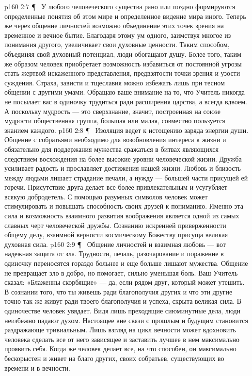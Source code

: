 \vs p160 2:7 \P\ \bibnobreakspace {} У любого человеческого существа рано или поздно формируются определенные понятия об этом мире и определенное видение мира иного. Теперь же через общение личностей возможно объединение этих точек зрения на временное и вечное бытие. Благодаря этому ум одного, заимствуя многое из понимания другого, увеличивает свои духовные ценности. Таким способом, объединяя свой духовный потенциал, люди обогащают душу. Более того, таким же образом человек приобретает возможность избавиться от постоянной угрозы стать жертвой искаженного представления, предвзятости точки зрения и узости суждения. Страха, зависти и тщеславия можно избежать лишь при тесном общении с другими умами. Обращаю ваше внимание на то, что Учитель никогда не посылает вас в одиночку трудиться ради расширения царства, а всегда вдвоем. А поскольку мудрость --- это сверхзнание, значит, построенная на союзе мудрости общественная группа, большая или малая, совместно пользуется знанием каждого.
\vs p160 2:8 \P\ \bibnobreakspace {} Изоляция ведет к истощению заряда энергии души. Общение с собратьями необходимо для возобновления интереса к жизни и обязательно для поддержания мужества сражаться в битвах являющихся следствием восхождения на более высокие уровни человеческой жизни. Дружба усиливает радость и прославляет достижения нашей жизни. Любовь и близость между людьми лишает страдание печали, а нужду --- большей части присущей ей горечи. Присутствие друга делает все более привлекательным и усугубляет всякую добродетель. С помощью разумных символов человек может стимулировать и повышать способность своих друзей к пониманию. Именно эта сила и возможность взаимного развития воображения является одной из самых славных черт человеческой дружбы. Сознанию искренней приверженности общему делу, взаимной верности космическому Божеству присуща великая духовная сила.
\vs p160 2:9 \P\ \bibnobreakspace {} Общение личностей и взаимная любовь --- вот надежная защита от зла. Трудности, печаль, разочарование и поражение в одиночку переносятся гораздо больнее и еще больше лишают мужества. Общение не превращает зло в добро, но помогает, сильно уменьшая боль. Ваш Учитель сказал: «Блаженны скорбящие» --- да, если рядом друг, который может утешить. В сознании того, что ты живешь ради благополучия других и что эти другие точно так же живут ради твоего благополучия и успеха, скрыта великая сила. В одиночестве человек увядает. Видя лишь преходящие сиюминутные дела, люди неизбежно падают духом. Настоящее вне связи с прошлым и будущим становится раздражающе тривиальным. Лишь взгляд на цикл вечности может вдохновить человека сделать все от него зависящее и заставить лучшее в нем максимально проявить себя. Когда же человек делает все, на что способен, он максимально бескорыстен и живет на благо других, своих собратьев, существующих во времени и в вечности.
